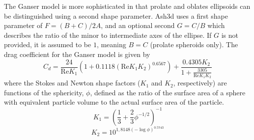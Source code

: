 The Ganser model is more sophisticated in that prolate and oblates ellipsoids
can be distinguished using a second shape parameter.  Ash3d uses a first
shape parameter of $F=(B+C)/2A$, and an optional second $G=C/B$ which describes
the ratio of the minor to intermediate axes of the ellipse.  If $G$ is not
provided, it is assumed to be $1$, meaning $B=C$ (prolate spheroids only).
The drag coefficient for the Ganser model is given by
\begin{equation}\label{EqFVGansCd}
C_d = \frac{24}{\mathrm{Re}K_1} \left( 1 + 0.1118 \left(\mathrm{Re} K_1 K_2 \right)^{0.6567}\right)
+ \frac{0.4305 K_2}{1+ \frac{3305}{\mathrm{Re} K_1 K_2}}
\end{equation}
where the Stokes and Newton shape factors ($K_1$ and $K_2$, respectively)
are functions of the sphericity, $\phi$, defined as
the ratio of the surface area of a sphere with equivalent particle volume to
the actual surface area of the particle.  
\begin{equation}\label{EqFVGansK1}
K_1 = \left( \frac{1}{3} +\frac{2}{3}\phi^{-1/2}  \right)^{-1}
\end{equation}
\begin{equation}\label{EqFVGansK2}
K_2 = 10^{1,8148 \left( -\log \phi \right)^{0.5743}}
\end{equation}

